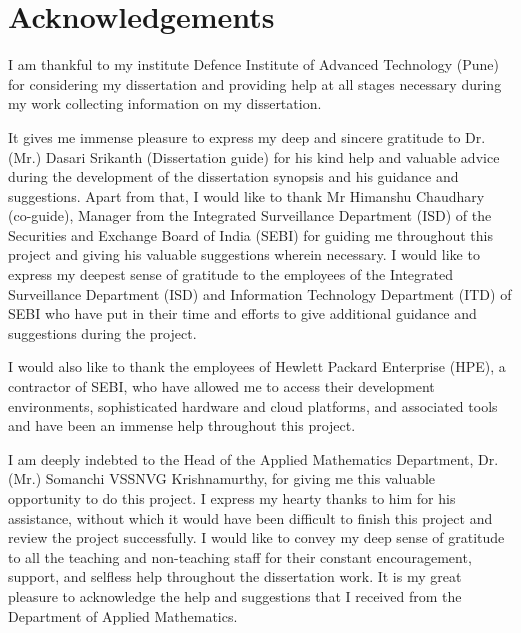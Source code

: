 \chapter*{Acknowledgements}

I am thankful to my institute Defence Institute of Advanced
Technology (Pune) for considering my dissertation and providing help
at all stages necessary during my work collecting information on my
dissertation. \par

It gives me immense pleasure to express my deep and sincere gratitude
to Dr.(Mr.) Dasari Srikanth (Dissertation guide) for his kind help
and valuable advice during the development of the dissertation
synopsis and his guidance and suggestions.
Apart from that, I would like to thank Mr Himanshu Chaudhary
(co-guide), Manager from the Integrated Surveillance Department (ISD)
of the Securities and Exchange Board of India (SEBI) for guiding me
throughout this project and giving his valuable suggestions wherein
necessary. I would like to express my deepest sense of gratitude to
the employees of the Integrated Surveillance Department (ISD) and
Information Technology Department (ITD) of SEBI who have put in their
time and efforts to give additional guidance and suggestions during
the project. \par
I would also like to thank the employees of Hewlett Packard
Enterprise (HPE), a contractor of SEBI, who have allowed me to access
their development environments, sophisticated hardware and cloud
platforms, and associated tools and have been an immense help
throughout this project. \par
I am deeply indebted to the Head of the Applied Mathematics
Department, Dr. (Mr.) Somanchi VSSNVG Krishnamurthy, for giving me
this valuable opportunity to do this project. I express my hearty
thanks to him for his assistance, without which it would have been
difficult to finish this project and review the project successfully.
I would like to convey my deep sense of gratitude to all the teaching
and non-teaching staff for their constant encouragement, support, and
selfless help throughout the dissertation work. It is my great
pleasure to acknowledge the help and suggestions that I received from
the Department of Applied Mathematics.
